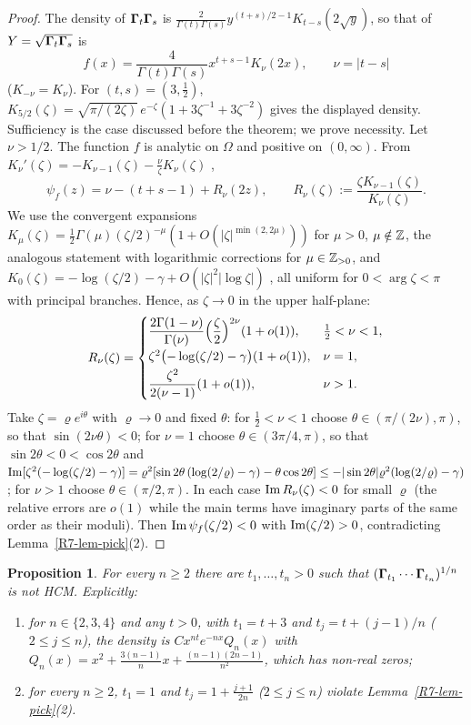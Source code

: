 \documentclass[11pt]{amsart}
\newtheorem{proposition}[theorem]{Proposition}
\theoremstyle{definition}
\theoremstyle{remark}
\begin{document}
\begin{proof}
The density of $\boldsymbol{\Gamma}_t\boldsymbol{\Gamma}_s$ is
$\frac{2}{\Gamma(t)\Gamma(s)}y^{(t+s)/2-1}K_{t-s}(2\sqrt y)$, so that of
$Y=\sqrt{\boldsymbol{\Gamma}_t\boldsymbol{\Gamma}_s}$ is
\[
 f(x)=\frac{4}{\Gamma(t)\Gamma(s)}x^{t+s-1}K_\nu(2x),\qquad \nu=|t-s|
\]
($K_{-\nu}=K_\nu$). For $(t,s)=(3,\tfrac12)$, $K_{5/2}(\zeta)=\sqrt{\pi/(2\zeta)}\,
e^{-\zeta}(1+3\zeta^{-1}+3\zeta^{-2})$ gives the displayed density.
Sufficiency is the case discussed before the theorem; we prove necessity. Let $\nu>1/2$. The
function $f$ is analytic on $\Omega$ and positive on $(0,\infty)$. From
$K_\nu'(\zeta)=-K_{\nu-1}(\zeta)-\frac\nu\zeta K_\nu(\zeta)$
\cite[10.29.2]{R7-DLMF},
\[
 \psi_f(z)=\nu-(t+s-1)+R_\nu(2z),\qquad R_\nu(\zeta):=\frac{\zeta K_{\nu-1}(\zeta)}{K_\nu(\zeta)} .
\]
We use the convergent expansions
$K_\mu(\zeta)=\tfrac12\Gamma(\mu)(\zeta/2)^{-\mu}(1+O(|\zeta|^{\min(2,2\mu)}))$
for $\mu>0$, $\mu\notin\mathbb{Z}$, the analogous statement with logarithmic
corrections for $\mu\in\mathbb{Z}_{>0}$, and
$K_0(\zeta)=-\log(\zeta/2)-\gamma+O(|\zeta|^2|\log\zeta|)$
\cite[10.27.4, 10.31.1, 10.31.2]{R7-DLMF}, all uniform for
$0<\arg\zeta<\pi$ with principal branches. Hence, as $\zeta\to0$ in the upper
half-plane:
\[
 R_\nu(\zeta)=\begin{cases}
 \dfrac{2\Gamma(1-\nu)}{\Gamma(\nu)}\Bigl(\dfrac\zeta2\Bigr)^{2\nu}(1+o(1)), & \tfrac12<\nu<1,\\[2mm]
 \zeta^2\bigl(-\log(\zeta/2)-\gamma\bigr)(1+o(1)), & \nu=1,\\[1mm]
 \dfrac{\zeta^2}{2(\nu-1)}(1+o(1)), & \nu>1 .
 \end{cases}
\]
Take $\zeta=\varrho e^{i\theta}$ with $\varrho\to0$ and fixed $\theta$:
for $\frac12<\nu<1$ choose $\theta\in(\pi/(2\nu),\pi)$, so that
$\sin(2\nu\theta)<0$; for $\nu=1$ choose $\theta\in(3\pi/4,\pi)$, so that
$\sin2\theta<0<\cos2\theta$ and
$\operatorname{Im}[\zeta^2(-\log(\zeta/2)-\gamma)]=\varrho^2[\sin2\theta\,(\log(2/\varrho)-\gamma)-\theta\cos2\theta]
\le-|\sin 2\theta|\varrho^2(\log(2/\varrho)-\gamma)$; for $\nu>1$ choose
$\theta\in(\pi/2,\pi)$. In each case $\operatorname{Im} R_\nu(\zeta)<0$ for small
$\varrho$ (the relative errors are $o(1)$ while the main terms have imaginary
parts of the same order as their moduli). Then $\operatorname{Im}\psi_f(\zeta/2)<0$ with
$\operatorname{Im}(\zeta/2)>0$, contradicting Lemma~\ref{R7-lem-pick}(2).
\end{proof}

\begin{proposition}\label{R7-prop-nfold}
For every $n\ge2$ there are $t_1,\dots,t_n>0$ such that
$(\boldsymbol{\Gamma}_{t_1}\cdots\boldsymbol{\Gamma}_{t_n})^{1/n}$ is not HCM. Explicitly:
\begin{enumerate}
\item[(1)] for $n\in\{2,3,4\}$ and any $t>0$, with $t_1=t+3$ and
  $t_j=t+(j-1)/n$ ($2\le j\le n$), the density is
  $Cx^{nt}e^{-nx}Q_n(x)$ with
  $Q_n(x)=x^2+\frac{3(n-1)}{n}x+\frac{(n-1)(2n-1)}{n^2}$, which has non-real
  zeros;
\item[(2)] for every $n\ge2$, $t_1=1$ and $t_j=1+\frac{j+1}{2n}$ ($2\le j\le n$)
  violate Lemma~\ref{R7-lem-pick}(2).
\end{enumerate}
\end{proposition}
\end{document}
